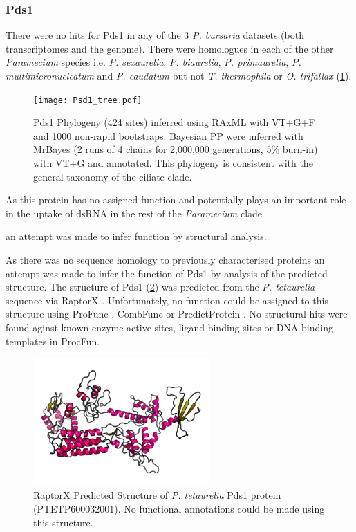 \subsubsection{Pds1}

There were no hits for Pds1 in any of the 3 \textit{P. bursaria} datasets 
(both transcriptomes and the genome).  
There were homologues in each of the other \textit{Paramecium} species
i.e. \textit{P. sexaurelia}, \textit{P. biaurelia}, \textit{P. primaurelia},
\textit{P. multimicronucleatum} and \textit{P. caudatum} but not
\textit{T. thermophila} or \textit{O. trifallax} (\cref{fig:pds1}).
\begin{figure}
    \texttt{[image: Psd1\_tree.pdf]}
    \caption[Pds1 Phylogeny]{Pds1 Phylogeny (424 sites) inferred
        using RAxML with VT+G+F and 1000 non-rapid bootstraps.  Bayesian
        PP were inferred with MrBayes (2 runs of 4 chains for 2,000,000 generations, 5\% burn-in) 
        with VT+G and annotated. This phylogeny is consistent with the general
    taxonomy of the ciliate clade.}
\label{fig:pds1}
\end{figure}

As this protein has no assigned function \citep{Marker2014,Carradec2015}
and potentially plays an important role in the uptake of dsRNA in
the rest of the \textit{Paramecium} clade 




an attempt was made to infer function by structural analysis. 

As there was no sequence homology to previously characterised proteins 
an attempt was made to infer the function of Pds1 by analysis of the
predicted structure.
The structure of Pds1 (\cref{fig:pds1_struct}) was predicted 
from the \textit{P. tetaurelia}
sequence via RaptorX \citep{Kallberg2012}.  Unfortunately,
no function could be assigned to this structure using ProFunc \citep{Laskowski2005},
CombFunc \citep{Wass2012} or PredictProtein \citep{Rost2004}.
No structural hits were found aginst known enzyme active sites, ligand-binding
sites or DNA-binding templates in ProcFun.

\begin{figure}
    \centering
    \includegraphics[width=0.6\textwidth]{psd1_struct.png}
    \caption[Predicted Structure of Pds1]{RaptorX Predicted Structure of \textit{P. tetaurelia}
    Pds1 protein (PTETP600032001). No functional annotations could be made using this structure.}
    \label{fig:pds1_struct}
\end{figure}

